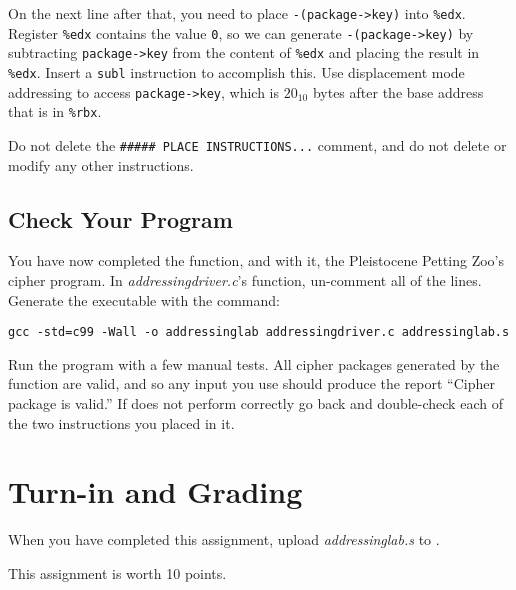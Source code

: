 On the next line after that, you need to place \lstinline{-(package->key)} into
\lstinline{%edx}. Register \lstinline{%edx} contains the value \lstinline{0},
so we can generate \lstinline{-(package->key)} by subtracting
\lstinline{package->key} from the content of \lstinline{%edx} and placing the
result in \lstinline{%edx}. Insert a \lstinline{subl} instruction to accomplish
this. Use displacement mode addressing to access \lstinline{package->key}, which
is $20_{10}$ bytes after the base address that is in \lstinline{%rbx}.


Do not delete the \texttt{\#\#\#\#\# PLACE INSTRUCTIONS...} comment, and do not
delete or modify any other instructions.

\subsection*{Check Your Program}

You have now completed the  function, and with it,
the Pleistocene Petting Zoo's cipher program. In \textit{addressingdriver.c}'s
 function, un-comment all of the lines. Generate the executable
with the command:

\texttt{gcc -std=c99 -Wall -o addressinglab addressingdriver.c addressinglab.s}

Run the program with a few manual tests. All cipher packages generated by the
 function are valid, and so any input you use should produce the
report ``Cipher package is valid.'' If  does not
perform correctly go back and double-check each of the two instructions you
placed in it.


\section*{Turn-in and Grading}

When you have completed this assignment, upload \textit{addressinglab.s} to
\filesubmission.

This assignment is worth 10 points. \\

\begin{description}
\end{description}

